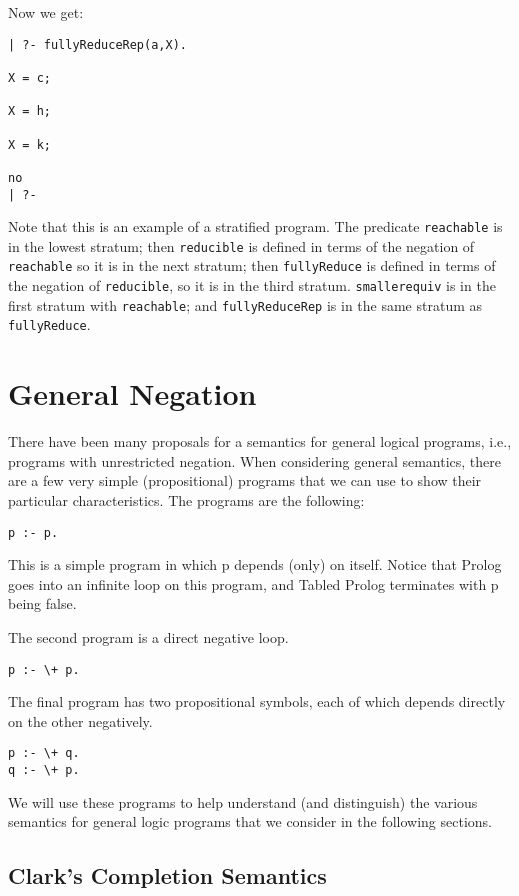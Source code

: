 Now we get:
\begin{verbatim}
| ?- fullyReduceRep(a,X).

X = c;

X = h;

X = k;

no
| ?- 
\end{verbatim}

Note that this is an example of a stratified program.  The predicate
\verb|reachable| is in the lowest stratum; then \verb|reducible| is
defined in terms of the negation of \verb|reachable| so it is in the
next stratum; then \verb|fullyReduce| is defined in terms of the
negation of \verb|reducible|, so it is in the third stratum.
\verb|smallerequiv| is in the first stratum with \verb|reachable|;
and \verb|fullyReduceRep| is in the same stratum as
\verb|fullyReduce|.


\section{General Negation}

There have been many proposals for a semantics for general logical
programs, i.e., programs with unrestricted negation.  When considering
general semantics, there are a few very simple (propositional)
programs that we can use to show their particular characteristics.
The programs are the following:
\begin{verbatim}
p :- p.
\end{verbatim}
This is a simple program in which p depends (only) on itself.  Notice
that Prolog goes into an infinite loop on this program, and Tabled
Prolog terminates with p being false.

The second program is a direct negative loop.
\begin{verbatim}
p :- \+ p.
\end{verbatim}

The final program has two propositional symbols, each of which depends
directly on the other negatively.
\begin{verbatim}
p :- \+ q.
q :- \+ p.
\end{verbatim}

We will use these programs to help understand (and distinguish) the
various semantics for general logic programs that we consider in the
following sections.

\subsection{Clark's Completion Semantics}

